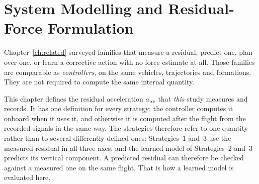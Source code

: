 %
%
%
%

\chapter{System Modelling and Residual-Force Formulation}
\label{ch:model}

Chapter~\ref{ch:related} surveyed families that measure a residual, predict one, plan over one, or
learn a corrective action with no force estimate at all. Those families are comparable as
\emph{controllers}, on the same vehicles, trajectories and formations. They are not required to
compute the same internal quantity.

This chapter defines the residual acceleration $a_{\mathrm{res}}$ that \emph{this} study measures
and records. It has one definition for every strategy: the controller computes it onboard when it
uses it, and otherwise it is computed after the flight from the recorded signals in the same way.
The strategies therefore refer to one quantity rather than to several differently-defined ones:
Strategies~1 and~3 use the measured residual in all three axes, and the learned model of
Strategies~2 and~3 predicts its vertical component. A predicted residual can therefore be checked
against a measured one on the same flight. That is how a learned model is evaluated here.

